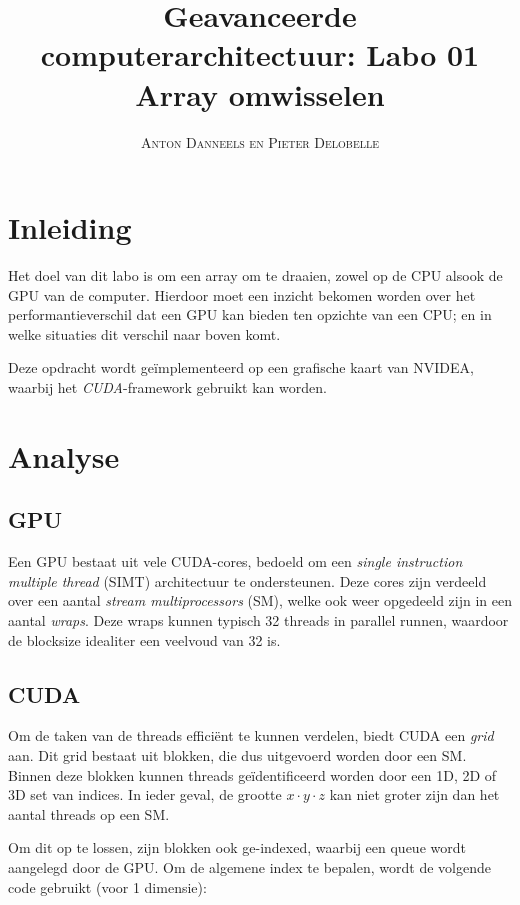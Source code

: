 \documentclass[twocolumn, a4paper]{article}
\begin{document}
\title{Geavanceerde computerarchitectuur: Labo 01 \\ 
\large{Array omwisselen}}
\author{\textsc{Anton Danneels en Pieter Delobelle}}
\date{}
\maketitle

\section{Inleiding}
Het doel van dit labo is om een array om te draaien, zowel op de CPU alsook de GPU van de computer. 
Hierdoor moet een inzicht bekomen worden over het performantieverschil dat een GPU kan bieden ten opzichte van een CPU; en in welke situaties dit verschil naar boven komt.

Deze opdracht wordt ge\"implementeerd op een grafische kaart van NVIDEA, waarbij het \emph{CUDA}-framework gebruikt kan worden. 

\section{Analyse}

\subsection{GPU}
Een GPU bestaat uit vele CUDA-cores, bedoeld om een \emph{single instruction multiple thread} (SIMT) architectuur te ondersteunen. Deze cores zijn verdeeld over een aantal \emph{stream multiprocessors} (SM), welke ook weer opgedeeld zijn in een aantal \emph{wraps}. Deze wraps kunnen typisch 32 threads in parallel runnen, waardoor de blocksize idealiter een veelvoud van 32 is.

\subsection{CUDA}
Om de taken van de threads effici\"ent te kunnen verdelen, biedt CUDA een \emph{grid} aan. Dit grid bestaat uit blokken, die dus uitgevoerd worden door een SM. Binnen deze blokken kunnen threads ge\"identificeerd worden door een 1D, 2D of 3D set van indices. In ieder geval, de grootte $x \cdot y \cdot z$ kan niet groter zijn dan het aantal threads op een SM.

Om dit op te lossen, zijn blokken ook ge-indexed, waarbij een queue wordt aangelegd door de GPU. Om de algemene index te bepalen, wordt de volgende code gebruikt (voor 1 dimensie): 
\end{document}

